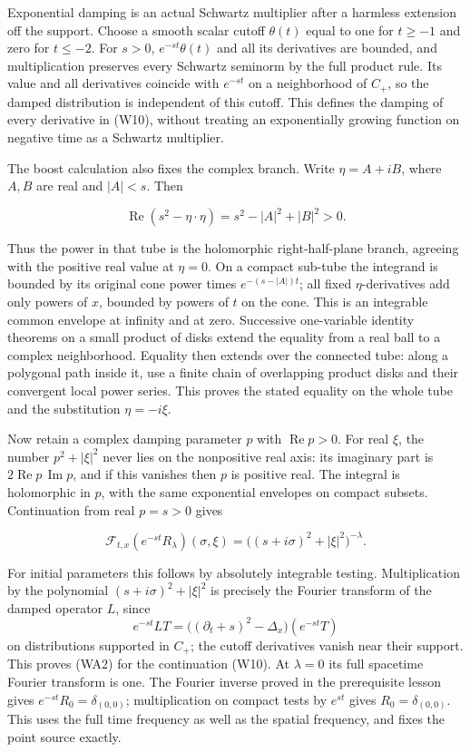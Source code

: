 \documentclass[
  11pt,
]{article}
\begin{document}
Exponential damping is an actual Schwartz multiplier after a harmless
extension off the support. Choose a smooth scalar cutoff \(\theta(t)\)
equal to one for \(t\geq-1\) and zero for \(t\leq-2\). For \(s>0\),
\(e^{-st}\theta(t)\) and all its derivatives are bounded, and
multiplication preserves every Schwartz seminorm by the full product
rule. Its value and all derivatives coincide with \(e^{-st}\) on a
neighborhood of \(C_+\), so the damped distribution is independent of
this cutoff. This defines the damping of every derivative in (W10),
without treating an exponentially growing function on negative time as a
Schwartz multiplier.

The boost calculation also fixes the complex branch. Write
\(\eta=A+iB\), where \(A,B\) are real and \(|A|<s\). Then

\[
 \operatorname{Re}(s^2-\eta\cdot\eta)
       =s^2-|A|^2+|B|^2>0.
 \tag{WA1}
\]

Thus the power in that tube is the holomorphic right-half-plane branch,
agreeing with the positive real value at \(\eta=0\). On a compact
sub-tube the integrand is bounded by its original cone power times
\(e^{-(s-|A|)t}\); all fixed \(\eta\)-derivatives add only powers of
\(x\), bounded by powers of \(t\) on the cone. This is an integrable
common envelope at infinity and at zero. Successive one-variable
identity theorems on a small product of disks extend the equality from a
real ball to a complex neighborhood. Equality then extends over the
connected tube: along a polygonal path inside it, use a finite chain of
overlapping product disks and their convergent local power series. This
proves the stated equality on the whole tube and the substitution
\(\eta=-i\xi\).

Now retain a complex damping parameter \(p\) with
\(\operatorname{Re}p>0\). For real \(\xi\), the number \(p^2+|\xi|^2\)
never lies on the nonpositive real axis: its imaginary part is
\(2\operatorname{Re}p\,\operatorname{Im}p\), and if this vanishes then
\(p\) is positive real. The integral is holomorphic in \(p\), with the
same exponential envelopes on compact subsets. Continuation from real
\(p=s>0\) gives

\[
 \mathcal F_{t,x}(e^{-st}R_\lambda)(\sigma,\xi)
      =\big((s+i\sigma)^2+|\xi|^2\big)^{-\lambda}.
 \tag{WA2}
\]

For initial parameters this follows by absolutely integrable testing.
Multiplication by the polynomial \((s+i\sigma)^2+|\xi|^2\) is precisely
the Fourier transform of the damped operator \(L\), since \[
 e^{-st}LT=\big((\partial_t+s)^2-\Delta_x\big)(e^{-st}T)
 \tag{WA3}
\] on distributions supported in \(C_+\); the cutoff derivatives vanish
near their support. This proves (WA2) for the continuation (W10). At
\(\lambda=0\) its full spacetime Fourier transform is one. The Fourier
inverse proved in the prerequisite lesson gives
\(e^{-st}R_0=\delta_{(0,0)}\); multiplication on compact tests by
\(e^{st}\) gives \(R_0=\delta_{(0,0)}\). This uses the full time
frequency as well as the spatial frequency, and fixes the point source
exactly.
\end{document}
